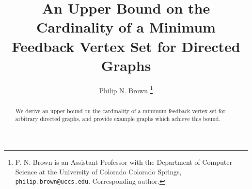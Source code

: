 \documentclass[journal,12pt,onecolumn]{IEEETran}  %
\begin{document}
%
\title{An Upper Bound on the Cardinality of a Minimum Feedback Vertex Set for Directed Graphs}


\author{{Philip N. Brown}
\thanks{P. N. Brown is an Assistant Professor with the Department of Computer Science at the University of Colorado Colorado Springs, {\texttt{philip.brown@uccs.edu}. Corresponding author.}}
}


% 








\maketitle

\begin{abstract}
We derive an upper bound on the cardinality of a minimum feedback vertex set for arbitrary directed graphs, and provide example graphs which achieve this bound.
\end{abstract}
\end{document}
